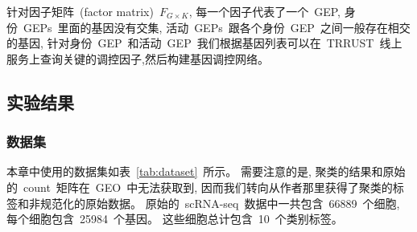 针对因子矩阵~(factor matrix)~$F_{G \times K}$, 每一个因子代表了一个~GEP, 
身份~GEPs~里面的基因没有交集, 活动~GEPs~跟各个身份~GEP~之间一般存在相交的基因, 
针对身份~GEP~和活动~GEP~我们根据基因列表可以在~TRRUST~线上服务上查询关键的调控因子,然后构建基因调控网络。


\subsection{实验结果}


\subsubsection{数据集}
本章中使用的数据集如表~\ref{tab:dataset}~所示。
需要注意的是, 聚类的结果和原始的~count~矩阵在~GEO~中无法获取到,
因而我们转向从作者那里获得了聚类的标签和非规范化的原始数据。
原始的~scRNA-seq~数据中一共包含~66889~个细胞, 每个细胞包含~25984~个基因。
这些细胞总计包含~10~个类别标签。

\begin{table}[!htbp]
    \caption{\label{tab:dataset}使用的公开数据集} 
\end{table}

